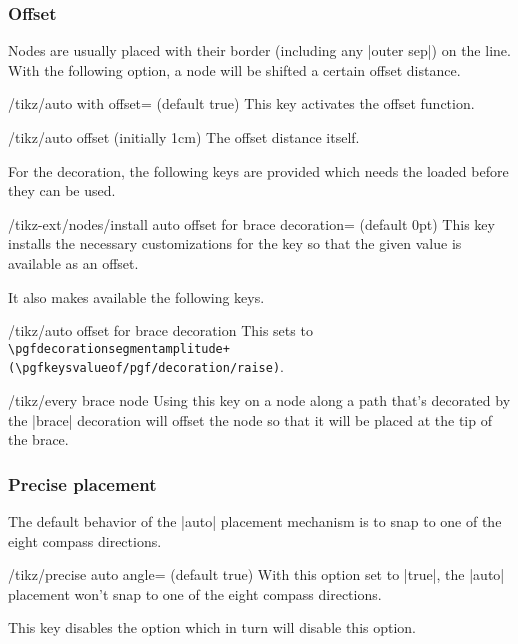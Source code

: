 \begin{multicols}{2}
\subsubsection{Offset}
Nodes are usually placed with their border (including any |outer sep|)
on the line.
With the following option, a node will be shifted a certain offset distance.

\begin{key}{/tikz/auto with offset= (default true)}
  This key activates the offset function.
\end{key}
\begin{key}{/tikz/auto offset (initially 1cm)}
The offset distance itself.
\end{key}

For the  decoration,
the following keys are provided which needs the
 loaded before they
can be used.
\begin{key}{/tikz-ext/nodes/install auto offset for brace decoration= (default 0pt)}
This key installs the necessary customizations
for the  key
so that the given value is available as an offset.

It also makes available the following keys.
\begin{stylekey}{/tikz/auto offset for brace decoration}
This sets  to
\texttt{\textbackslash pgfdecorationsegmentamplitude+
  (\textbackslash pgfkeysvalueof{/pgf/decoration/raise})}.
\end{stylekey}
\begin{stylekey}{/tikz/every brace node}
Using this key on a node along a path that's decorated by the |brace| decoration
will offset the node so that it will be placed at the tip of the brace.
\end{stylekey}
\end{key}

\subsubsection{Precise placement}
The default behavior of the |auto| placement mechanism is
to snap to one of the eight compass directions.
\begin{key}{/tikz/precise auto angle= (default true)}
With this option set to |true|, the |auto| placement won't snap
to one of the eight compass directions.

This key disables the  option
which in turn will disable this option.
\end{key}
\end{multicols}
